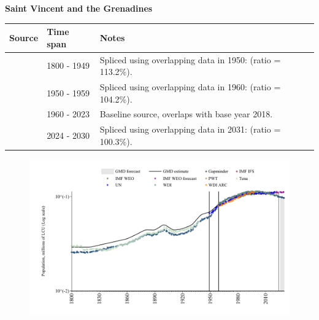 \documentclass[12pt,a4paper,landscape]{article}
\begin{document}
\begin{adjustbox}{max totalsize={\paperwidth}{\paperheight},center}
\begin{minipage}[t][\textheight][t]{\textwidth}
\vspace*{0.5cm}
{}
\begin{center}
{\Large\bfseries Saint Vincent and the Grenadines}
\end{center}
\vspace{0.5cm}
\begin{table}[H]
\centering
\small
\begin{tabular}{|l|l|l|}
\hline
\textbf{Source} & \textbf{Time span} & \textbf{Notes} \\
\hline
\rowcolor{white}\cite{Gapminder}& 1800 - 1949 &Spliced using overlapping data in 1950: (ratio = 113.2\%).\\
\rowcolor{lightgray}\cite{IMF_IFS}& 1950 - 1959 &Spliced using overlapping data in 1960: (ratio = 104.2\%).\\
\rowcolor{white}\cite{WDI}& 1960 - 2023 &Baseline source, overlaps with base year 2018.\\
\rowcolor{lightgray}\cite{Gapminder}& 2024 - 2030 &Spliced using overlapping data in 2031: (ratio = 100.3\%).\\
\hline
\end{tabular}
\end{table}
\begin{figure}[H]
\centering
\includegraphics[width=\textwidth,height=0.6\textheight,keepaspectratio]{graphs/VCT_pop.pdf}
\end{figure}
\end{minipage}
\end{adjustbox}
\end{document}

